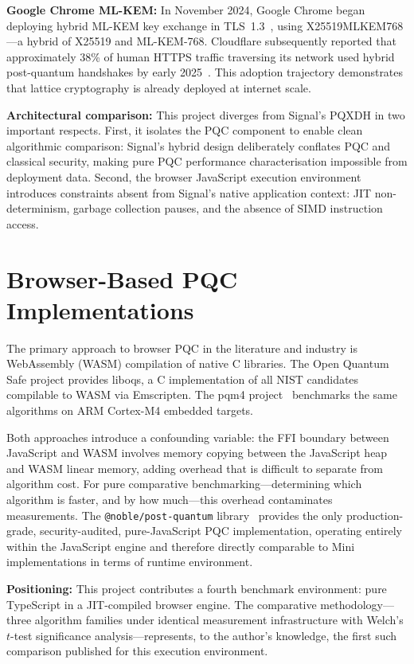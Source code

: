 \documentclass[12pt,a4paper]{report}
\begin{document}
\textbf{Google Chrome ML-KEM:} In November 2024, Google Chrome began deploying hybrid
ML-KEM key exchange in TLS~1.3~\cite{tls13}, using X25519MLKEM768---a hybrid of
X25519 and ML-KEM-768. Cloudflare subsequently reported that approximately 38\% of
human HTTPS traffic traversing its network used hybrid post-quantum handshakes by
early 2025~\cite{nist_migration}. This adoption trajectory demonstrates that lattice
cryptography is already deployed at internet scale.

\textbf{Architectural comparison:} This project diverges from Signal's PQXDH in two
important respects. First, it isolates the PQC component to enable clean algorithmic
comparison: Signal's hybrid design deliberately conflates PQC and classical security,
making pure PQC performance characterisation impossible from deployment data. Second,
the browser JavaScript execution environment introduces constraints absent from Signal's
native application context: JIT non-determinism, garbage collection pauses, and the
absence of SIMD instruction access.

\section{Browser-Based PQC Implementations}

The primary approach to browser PQC in the literature and industry is WebAssembly
(WASM) compilation of native C libraries. The Open Quantum Safe project provides
liboqs, a C implementation of all NIST candidates compilable to WASM via Emscripten.
The pqm4 project~\cite{pqm4} benchmarks the same algorithms on ARM Cortex-M4
embedded targets.

Both approaches introduce a confounding variable: the FFI boundary between JavaScript
and WASM involves memory copying between the JavaScript heap and WASM linear memory,
adding overhead that is difficult to separate from algorithm cost. For pure comparative
benchmarking---determining which algorithm is faster, and by how much---this overhead
contaminates measurements. The \texttt{@noble/post-quantum} library~\cite{noble_pq}
provides the only production-grade, security-audited, pure-JavaScript PQC
implementation, operating entirely within the JavaScript engine and therefore directly
comparable to Mini implementations in terms of runtime environment.

\textbf{Positioning:} This project contributes a fourth benchmark environment:
pure TypeScript in a JIT-compiled browser engine. The comparative methodology---three
algorithm families under identical measurement infrastructure with Welch's $t$-test
significance analysis---represents, to the author's knowledge, the first such
comparison published for this execution environment.
\end{document}
